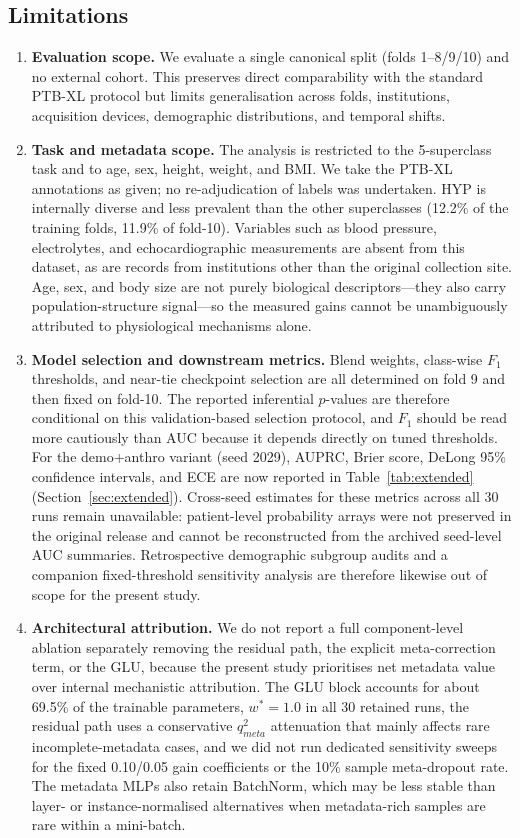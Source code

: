 \documentclass[mathematics,article,submit,pdftex]{Definitions/mdpi}
\def\texttt#1{#1}%
\def\mathrm#1{#1}%
\begin{document}
\subsection{Limitations}\label{sec:limits}

\begin{enumerate}[leftmargin=1.4em]
    \item \textbf{Evaluation scope.} We evaluate a single canonical split (folds 1--8/9/10) and no external cohort. This preserves direct comparability with the standard PTB-XL protocol but limits generalisation across folds, institutions, acquisition devices, demographic distributions, and temporal shifts.
    \item \textbf{Task and metadata scope.} The analysis is restricted to the 5-superclass task and to age, sex, height, weight, and BMI. We take the PTB-XL annotations as given; no re-adjudication of labels was undertaken. HYP is internally diverse and less prevalent than the other superclasses (12.2\% of the training folds, 11.9\% of fold-10). Variables such as blood pressure, electrolytes, and echocardiographic measurements are absent from this dataset, as are records from institutions other than the original collection site. Age, sex, and body size are not purely biological descriptors—they also carry population-structure signal—so the measured gains cannot be unambiguously attributed to physiological mechanisms alone.
    \item \textbf{Model selection and downstream metrics.} Blend weights, class-wise $F_1$ thresholds, and near-tie checkpoint selection are all determined on fold 9 and then fixed on fold-10. The reported inferential $p$-values are therefore conditional on this validation-based selection protocol, and $F_1$ should be read more cautiously than AUC because it depends directly on tuned thresholds. For the \texttt{demo+anthro} variant (seed 2029), AUPRC, Brier score, DeLong 95\% confidence intervals, and ECE are now reported in Table~\ref{tab:extended} (Section~\ref{sec:extended}). Cross-seed estimates for these metrics across all 30 runs remain unavailable: patient-level probability arrays were not preserved in the original release and cannot be reconstructed from the archived seed-level AUC summaries. Retrospective demographic subgroup audits and a companion fixed-threshold sensitivity analysis are therefore likewise out of scope for the present study.
    \item \textbf{Architectural attribution.} We do not report a full component-level ablation separately removing the residual path, the explicit meta-correction term, or the GLU, because the present study prioritises net metadata value over internal mechanistic attribution. The GLU block accounts for about 69.5\% of the trainable parameters, $w^{\ast}{=}1.0$ in all 30 retained runs, the residual path uses a conservative $q_{\mathrm{meta}}^{2}$ attenuation that mainly affects rare incomplete-metadata cases, and we did not run dedicated sensitivity sweeps for the fixed 0.10/0.05 gain coefficients or the 10\% sample meta-dropout rate. The metadata MLPs also retain BatchNorm, which may be less stable than layer- or instance-normalised alternatives when metadata-rich samples are rare within a mini-batch.

\end{enumerate}
\end{document}
